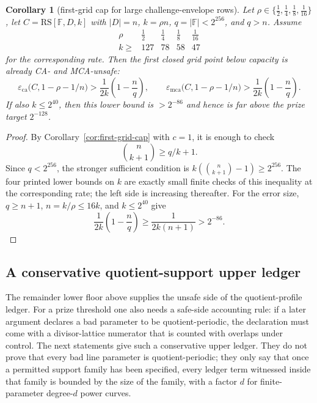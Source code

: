 \documentclass[11pt]{article}
\newtheorem{corollary}[theorem]{Corollary}
\theoremstyle{definition}
\theoremstyle{remark}
\newcommand{\F}{\mathbb{F}}
\newcommand{\RS}{\mathrm{RS}}
\newcommand{\eca}{\varepsilon_{\mathrm{ca}}}
\newcommand{\emca}{\varepsilon_{\mathrm{mca}}}
\begin{document}
\begin{corollary}[first-grid cap for large challenge-envelope rows]
\label{cor:first-grid-grand}
Let $\rho\in\{\frac12,\frac14,\frac18,\frac1{16}\}$, let
$C=\RS[\F,D,k]$ with $|D|=n$, $k=\rho n$, $q=|\F|<2^{256}$, and
$q>n$.  Assume
\[
\begin{array}{c|cccc}
\rho & \frac12 & \frac14 & \frac18 & \frac1{16}\\ \hline
k\ge & 127 & 78 & 58 & 47
\end{array}
\]
for the corresponding rate.  Then the first closed grid point below capacity is
already CA- and MCA-unsafe:
\[
        \eca\bigl(C,1-\rho-1/n\bigr)
        >\frac1{2k}\left(1-\frac nq\right),
        \qquad
        \emca\bigl(C,1-\rho-1/n\bigr)
        >\frac1{2k}\left(1-\frac nq\right).
\]
If also $k\le2^{40}$, then this lower bound is $>2^{-86}$ and hence is far
above the prize target $2^{-128}$.
\end{corollary}

\begin{proof}
By Corollary~\ref{cor:first-grid-cap} with $c=1$, it is enough to check
\[
        \binom n{k+1}\ge q/k+1.
\]
Since $q<2^{256}$, the stronger sufficient condition is
$k(\binom n{k+1}-1)\ge2^{256}$.  The four printed lower bounds on $k$ are exactly
small finite checks of this inequality at the corresponding rate; the left side
is increasing thereafter.  For the error size, $q\ge n+1$, $n=k/\rho\le16k$,
and $k\le2^{40}$ give
\[
        \frac1{2k}\left(1-\frac nq\right)
        \ge \frac1{2k(n+1)}
        >2^{-86}.
\]
\end{proof}


\subsection{A conservative quotient-support upper ledger}
\label{sec:quotient-support-upper}

The remainder lower floor above supplies the unsafe side of the quotient-profile
ledger.  For a prize threshold one also needs a safe-side accounting rule: if a
later argument declares a bad parameter to be quotient-periodic, the declaration
must come with a divisor-lattice numerator that is counted with overlaps under
control.  The next statements give such a conservative upper ledger.  They do
not prove that every bad line parameter is quotient-periodic; they only say that
once a permitted support family has been specified, every ledger term witnessed
inside that family is bounded by the size of the family, with a factor $d$ for
finite-parameter degree-$d$ power curves.
\end{document}
